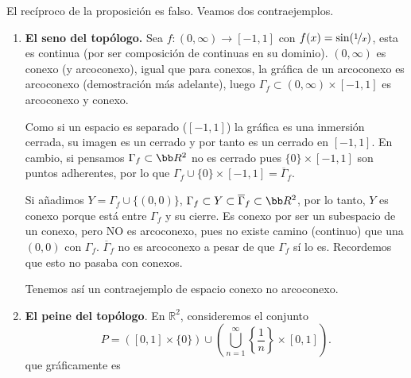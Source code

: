 \begin{obs}
    El rec\'iproco de la proposici\'on es falso. Veamos dos contraejemplos.
    \begin{enumerate}
        \item \textbf{El seno del top\'ologo.}
        Sea $f: (0,\infty) \longrightarrow [-1,1]$ con $f(x) = \sin(\nicefrac{1}{x})$, esta es continua (por ser composici\'on de continuas en su dominio). $(0,\infty)$ es conexo (y arcoconexo), igual que para conexos, la gr\'afica de un arcoconexo es arcoconexo (demostraci\'on m\'as adelante), luego $\Gamma_f \subset (0,\infty) \times [-1,1]$ es arcoconexo y conexo. 
        \begin{center}
\end{center}
        Como si un espacio es separado ($[-1,1]$) la gr\'afica es una inmersi\'on cerrada, su imagen es un cerrado y por tanto es un cerrado en $[-1,1]$. En cambio, si pensamos $\Gamma_f \subset \bb R^2$ no es cerrado pues $\{0\}\times [-1,1]$ son puntos adherentes, por lo que $\Gamma_f \cup \{0\}\times [-1,1] = \overline{\Gamma}_f$.

        Si a\~nadimos $Y = \Gamma_f \cup\{(0,0)\}$, $\Gamma_f \subset Y \subset \overline{\Gamma}_f \subset \bb R^2$, por lo tanto, $Y$ es conexo porque est\'a entre $\Gamma_f$ y su cierre. Es conexo por ser un subespacio de un conexo, pero NO es arcoconexo, pues no existe camino (continuo) que una $(0,0)$ con $\Gamma_f$. $\overline{\Gamma}_f$ no es arcoconexo a pesar de que $\Gamma_f $ s\'i lo es. Recordemos que esto no pasaba con conexos.  

        Tenemos as\'i un contraejemplo de espacio conexo no arcoconexo. 
        
        \item \textbf{El peine del top\'ologo}. En $\mathbb{R}^2$, consideremos el conjunto
\[
    P = ([0, 1] \times \{0\}) \cup \left(\bigcup_{n=1}^\infty \left\{\frac{1}{n}\right\} \times [0, 1]\right).
\]
que gr\'aficamente es
\begin{center}
\end{center}


\end{enumerate}
\end{obs}
